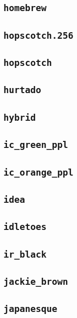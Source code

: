 \subsection{\texttt{homebrew}}
\newpage
\subsection{\texttt{hopscotch.256}}
\newpage
\subsection{\texttt{hopscotch}}
\newpage
\subsection{\texttt{hurtado}}
\newpage
\subsection{\texttt{hybrid}}
\newpage
\subsection{\texttt{ic\_green\_ppl}}
\newpage
\subsection{\texttt{ic\_orange\_ppl}}
\newpage
\subsection{\texttt{idea}}
\newpage
\subsection{\texttt{idletoes}}
\newpage
\subsection{\texttt{ir\_black}}
\newpage
\subsection{\texttt{jackie\_brown}}
\newpage
\subsection{\texttt{japanesque}}
\newpage
